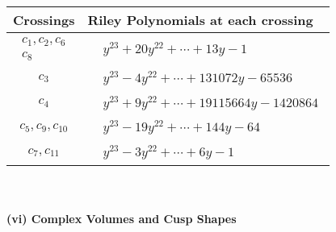 \documentclass[1p]{elsarticle_modified}
\theoremstyle{definition}
\begin{document}
\begin{tabular}{m{50pt}|m{274pt}}
Crossings & \hspace{64pt}Riley Polynomials at each crossing \\
\hline $$\begin{aligned}c_{1},c_{2},c_{6}\\c_{8}\end{aligned}$$&$\begin{aligned}
&y^{23}+20 y^{22}+\cdots+13 y-1
\end{aligned}$\\
\hline $$\begin{aligned}c_{3}\end{aligned}$$&$\begin{aligned}
&y^{23}-4 y^{22}+\cdots+131072 y-65536
\end{aligned}$\\
\hline $$\begin{aligned}c_{4}\end{aligned}$$&$\begin{aligned}
&y^{23}+9 y^{22}+\cdots+19115664 y-1420864
\end{aligned}$\\
\hline $$\begin{aligned}c_{5},c_{9},c_{10}\end{aligned}$$&$\begin{aligned}
&y^{23}-19 y^{22}+\cdots+144 y-64
\end{aligned}$\\
\hline $$\begin{aligned}c_{7},c_{11}\end{aligned}$$&$\begin{aligned}
&y^{23}-3 y^{22}+\cdots+6 y-1
\end{aligned}$\\
\hline
\end{tabular}\\~\\
\newpage\flushleft \textbf{(vi) Complex Volumes and Cusp Shapes}
\end{document}
